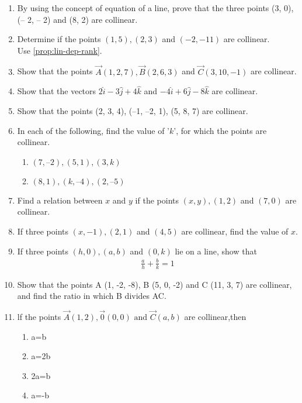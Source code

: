 \begin{enumerate}[label=\thesubsection.\arabic*,ref=\thesubsection.\theenumi]
\item 
 By using the concept of equation of a line, prove that the three points (3, 0), (– 2, – 2) and (8, 2) are collinear.
\label{chapters/11/10/2/20}
	\\
	\solution 

\item Determine if the points $(1,5),(2,3)$ and $(-2,-11)$ are collinear.
	\\
	\solution
Use		\eqref{prop:lin-dep-rank}.
%		
\item Show that the points $\vec{A}(1,2,7), \vec{B}(2,6,3)$ and $\vec{C}(3,10,-1)$ are collinear.
	\\
	\solution
%		
\item Show that the vectors $2\hat{i}-3\hat{j}+4\hat{k}$ and $-4\hat{i}+6\hat{j}-8\hat{k}$ are collinear.
   \\ 
    \solution 
%		
\item Show that the points (2, 3, 4), (–1, –2, 1), (5, 8, 7) are collinear.
		\\
		\solution
\item In each of the following, find the value of '$k$', for which the points are collinear.
\begin{enumerate}
\item $(7, –2), (5, 1), (3, k)$
\item $(8, 1), (k, – 4), (2, –5)$
\end{enumerate}
		\label{10/7/3/2}
\solution
\item Find a relation between $x$ and $y$ if the points $(x, y), (1, 2)$  and  $(7, 0)$ are collinear.
\\
\solution
\item If three points $(x, -1), (2, 1)$ and $(4, 5)$ are collinear, find the value of $x$.
\label{chapters/11/10/1/8}
%
\item If three points $(h, 0), (a, b)$ and $(0, k)$ lie on a line, 
show that 
\begin{align}
\frac{a}{h}+\frac{b}{k}=1
\end{align}
\label{chapters/11/10/1/13}
%
\item Show that the points A (1, -2, -8), B (5, 0, -2) and C (11, 3, 7) are collinear, and find the ratio in which B divides AC.\\
\item lf the points $\vec{A}(1,2),\vec{0}(0,0)\text{ and }\vec{C}(a,b)$ are collinear,then
\begin{enumerate}
\item a=b
\item a=2b
\item 2a=b
\item a=-b
\end{enumerate}
\end{enumerate}

